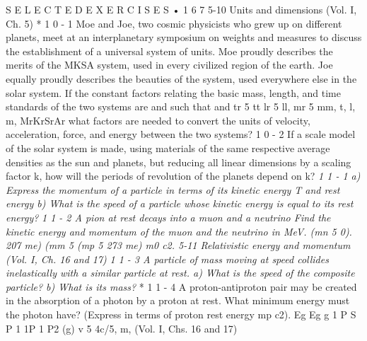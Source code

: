 \documentclass[11pt,oneside]{article}
\begin{document}
S E L E C T E D  E X E R C I S E S • 1 6 7 5-10 Units and dimensions (Vol. I, Ch. 5) * 1 0 - 1 Moe and Joe, two cosmic physicists who grew up on different planets, meet at an interplanetary symposium on weights and measures to discuss the establishment of a universal system of units. Moe proudly describes the merits of the MKSA system, used in every civilized region of the earth. Joe equally proudly describes the beauties of the system, used everywhere else in the solar system. If the constant factors relating the basic mass, length, and time standards of the two systems are and such that and tr 5 tt lr 5 ll, mr 5 mm, t, l, m, MrKrSrAr what factors are needed to convert the units of velocity, acceleration, force, and energy between the two systems? \emph{ } 1 0 - 2 If a scale model of the solar system is made, using materials of the same respective average densities as the sun and planets, but reducing all linear dimensions by a scaling factor k, how will the periods of revolution of the planets depend on k? \emph{ 1 1 - 1 a) Express the momentum of a particle in terms of its kinetic energy T and rest energy b) What is the speed of a particle whose kinetic energy is equal to its rest energy? } \emph{ 1 1 - 2 A pion at rest decays into a muon and a neutrino Find the kinetic energy and momentum of the muon and the neutrino in MeV. (mn 5 0). 207 me) (mm 5 (mp 5 273 me) m0 c2. 5-11 Relativistic energy and momentum (Vol. I, Ch. 16 and 17) } \emph{ 1 1 - 3 A particle of mass moving at speed collides inelastically with a similar particle at rest. a) What is the speed of the composite particle? b) What is its mass? } * 1 1 - 4 A proton-antiproton pair may be created in the absorption of a photon by a proton at rest. What minimum energy must the photon have? (Express in terms of proton rest energy mp c2). Eg Eg g 1 P S P 1 1P 1 P2 (g) v 5 4c/5, m, (Vol. I, Chs. 16 and 17)\par
\end{document}
